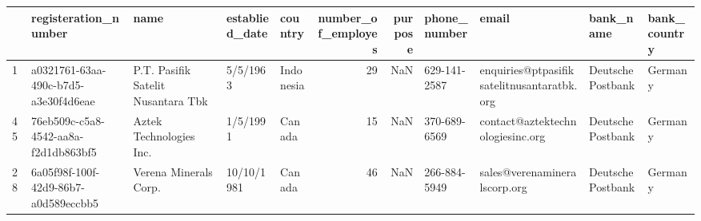 \begin{tabular}{lllllrrllll}
\toprule
{} &                  registeration\_number &                                name & establied\_date &    country &  number\_of\_employes &  purpose &  phone\_number &                                       email &          bank\_name & bank\_country \\
\midrule
1  &  a0321761-63aa-490c-b7d5-a3e30f4d6eae &  P.T. Pasifik Satelit Nusantara Tbk &       5/5/1963 &  Indonesia &                  29 &      NaN &  629-141-2587 &  enquiries@ptpasifiksatelitnusantaratbk.org &  Deutsche Postbank &      Germany \\
45 &  76eb509c-c5a8-4542-aa8a-f2d1db863bf5 &             Aztek Technologies Inc. &       1/5/1991 &     Canada &                  15 &      NaN &  370-689-6569 &            contact@aztektechnologiesinc.org &  Deutsche Postbank &      Germany \\
28 &  6a05f98f-100f-42d9-86b7-a0d589eccbb5 &               Verena Minerals Corp. &     10/10/1981 &     Canada &                  46 &      NaN &  266-884-5949 &                sales@verenamineralscorp.org &  Deutsche Postbank &      Germany \\
\bottomrule
\end{tabular}
